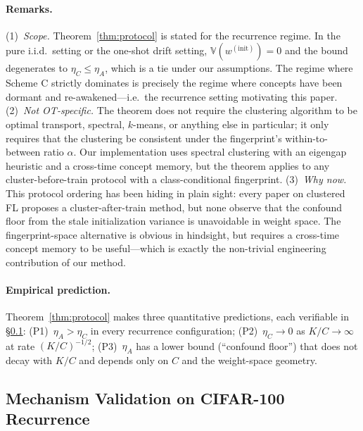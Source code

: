 \paragraph{Remarks.}
(1)~\emph{Scope.} Theorem~\ref{thm:protocol} is stated for the recurrence regime. In the pure i.i.d.\ setting or the one-shot drift setting, $\mathbb{V}(w^{(\mathrm{init})}) = 0$ and the bound degenerates to $\eta_C \le \eta_A$, which is a tie under our assumptions. The regime where Scheme C strictly dominates is precisely the regime where concepts have been dormant and re-awakened---i.e.\ the recurrence setting motivating this paper.
(2)~\emph{Not OT-specific.} The theorem does not require the clustering algorithm to be optimal transport, spectral, $k$-means, or anything else in particular; it only requires that the clustering be consistent under the fingerprint's within-to-between ratio $\alpha$. Our implementation uses spectral clustering with an eigengap heuristic and a cross-time concept memory, but the theorem applies to any cluster-before-train protocol with a class-conditional fingerprint.
(3)~\emph{Why now.} This protocol ordering has been hiding in plain sight: every paper on clustered FL proposes a cluster-after-train method, but none observe that the confound floor from the stale initialization variance is unavoidable in weight space. The fingerprint-space alternative is obvious in hindsight, but requires a cross-time concept memory to be useful---which is exactly the non-trivial engineering contribution of our method.

\paragraph{Empirical prediction.} Theorem~\ref{thm:protocol} makes three quantitative predictions, each verifiable in \S\ref{sec:mechanism}:
(P1)~$\eta_A > \eta_C$ in every recurrence configuration;
(P2)~$\eta_C \to 0$ as $K/C \to \infty$ at rate $(K/C)^{-1/2}$;
(P3)~$\eta_A$ has a lower bound (``confound floor'') that does not decay with $K/C$ and depends only on $C$ and the weight-space geometry.

\subsection{Mechanism Validation on CIFAR-100 Recurrence}
\label{sec:mechanism}

